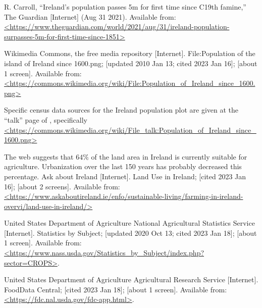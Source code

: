 \documentclass[prb,preprint]{revtex4-2}
\begin{document}
\begin{thebibliography}{99}
R. Carroll,
``Ireland’s population passes 5m for first time since C19th famine,''
The Guardian [Internet]
(Aug 31 2021).
Available from: \url{<https://www.theguardian.com/world/2021/aug/31/ireland-population-surpasses-5m-for-first-time-since-1851>}

Wikimedia Commons, the free media repository [Internet].
File:Population of the island of Ireland since 1600.png;
[updated 2010 Jan 13; cited 2023 Jan 16]; [about 1 screen].
Available from: \url{<https://commons.wikimedia.org/wiki/File:Population\_of\_Ireland\_since\_1600.png>}

Specific census data sources for the Ireland population plot are given at the ``talk'' page of \cite{pop_image}, specifically
\url{<https://commons.wikimedia.org/wiki/File\_talk:Population\_of\_Ireland\_since\_1600.png>}

The web suggests that $64\%$ of the land area in Ireland is currently suitable for agriculture.  Urbanization over the last 150 years has probably decreased this percentage.  
Ask about Ireland [Internet].
Land Use in Ireland; [cited 2023 Jan 16]; [about 2 screens].
Available from: \url{<https://www.askaboutireland.ie/enfo/sustainable-living/farming-in-ireland-overvi/land-use-in-ireland/>}

United States Department of Agriculture National Agricultural Statistics Service [Internet].
Statistics by Subject; 
[updated 2020 Oct 13; cited 2023 Jan 18]; [about 1 screen].
Available from: \url{<https://www.nass.usda.gov/Statistics_by_Subject/index.php?sector=CROPS>}.  

United States Department of Agriculture Agricultural Research Service [Internet].
FoodData Central; 
[cited 2023 Jan 18]; [about 1 screen].
Available from: \url{<https://fdc.nal.usda.gov/fdc-app.html>}.  


\end{thebibliography}
\end{document}
